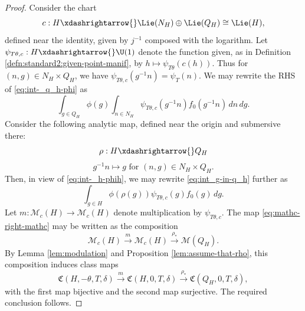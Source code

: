 \begin{proof}
  Consider the chart
  \begin{equation*}
    c : H \xdashrightarrow{} \Lie(N_H) \oplus  \Lie(Q_H) \cong \Lie(H),
  \end{equation*}
  defined near the identity, given by $j^{-1}$ composed with the logarithm.  Let $\psi_{T \theta, c} : H \xdashrightarrow{} \U(1)$ denote the function given, as in Definition \ref{defn:standard2:given-point-manif}, by $h \mapsto \psi_{T \theta}(c(h))$.  Thus for $(n,g) \in N_H \times Q_H$, we have $\psi_{T \theta, c}(g^{-1} n) = \psi_T(n)$.  We may rewrite the RHS of \eqref{eq:int-_q_h-phi} as
  \begin{equation}\label{eq:int_g-in-q_h}
    \int_{g \in Q_H} \phi(g) \int_{n \in N_H} \psi_{T \theta, c}(g^{-1} n) f_0(g^{-1} n) \, d n \, d g.
  \end{equation}
  Consider the following analytic map, defined near the origin and submersive there:
  \begin{equation*}
    \rho : H \xdashrightarrow{} Q_H
  \end{equation*}
  \begin{equation*}
    g^{-1} n \mapsto g \text{ for } (n,g) \in N_H \times Q_H.
  \end{equation*}
  Then, in view of \eqref{eq:int-_h-phih},  we may rewrite \eqref{eq:int_g-in-q_h} further as
  \begin{equation*}
    \int_{g \in H} \phi(\rho(g)) \psi_{T \theta , c}(g) f_0(g) \, d g.
  \end{equation*}
  Let $m : \mathcal{M}_c(H) \rightarrow \mathcal{M}_c(H)$ denote multiplication by $\psi_{T \theta, c}$.  The map \eqref{eq:mathc-right-mathc} may be written as the composition
  \begin{equation*}
    \mathcal{M}_c(H) \xrightarrow{m} \mathcal{M}_c(H) \xrightarrow{\rho_*} \mathcal{M}(Q_H).
  \end{equation*}
  By Lemma \ref{lem:modulation} and Proposition \ref{lem:assume-that-rho}, this composition induces class maps
  \begin{equation*}
    \mathfrak{C}(H,-\theta,T,\delta) \xrightarrow{m} \mathfrak{C}(H,0,T,\delta) \xrightarrow{\rho_*} \mathfrak{C}(Q_H,0,T,\delta),
  \end{equation*}
  with the first map bijective and the second map surjective.  The required conclusion follows.
\end{proof}

